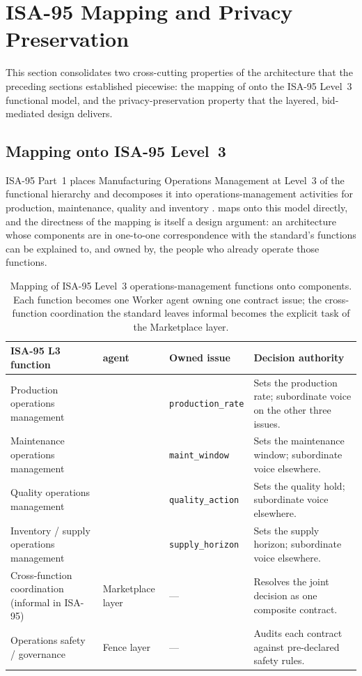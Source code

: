 \section{ISA-95 Mapping and Privacy Preservation}
\label{sec:arch-isa95}

This section consolidates two cross-cutting properties of the
architecture that the preceding sections established piecewise: the
mapping of \NEXUS{} onto the ISA-95 Level~3 functional model, and the
privacy-preservation property that the layered, bid-mediated design
delivers.

\subsection{Mapping onto ISA-95 Level~3}
\label{subsec:isa95-map}

ISA-95 Part~1 places Manufacturing Operations Management at Level~3 of
the functional hierarchy and decomposes it into operations-management
activities for production, maintenance, quality and inventory
\cite{isa95part1,sprock2019isa95}. \NEXUS{} maps onto this model
directly, and the directness of the mapping is itself a design
argument: an architecture whose components are in one-to-one
correspondence with the standard's functions can be explained to, and
owned by, the people who already operate those functions.

\begin{table}[ht]
\centering
\caption{Mapping of ISA-95 Level~3 operations-management functions onto
\NEXUS{} components. Each function becomes one Worker agent owning one
contract issue; the cross-function coordination the standard leaves
informal becomes the explicit task of the Marketplace layer.}
\label{tab:isa95}
\small
\begin{tabularx}{\textwidth}{@{}l l l X@{}}
\toprule
\textbf{ISA-95 L3 function} & \textbf{\NEXUS{} agent} & \textbf{Owned issue}
  & \textbf{Decision authority} \\
\midrule
Production operations management & \PSA{} & \texttt{production\_rate}
  & Sets the production rate; subordinate voice on the other three issues. \\
\addlinespace
Maintenance operations management & \PMA{} & \texttt{maint\_window}
  & Sets the maintenance window; subordinate voice elsewhere. \\
\addlinespace
Quality operations management & \QCA{} & \texttt{quality\_action}
  & Sets the quality hold; subordinate voice elsewhere. \\
\addlinespace
Inventory / supply operations management & \SCA{} & \texttt{supply\_horizon}
  & Sets the supply horizon; subordinate voice elsewhere. \\
\addlinespace
Cross-function coordination (informal in ISA-95) & Marketplace layer
  & --- & Resolves the joint decision as one composite contract. \\
\addlinespace
Operations safety / governance & Fence layer & ---
  & Audits each contract against pre-declared safety rules. \\
\bottomrule
\end{tabularx}
\end{table}

